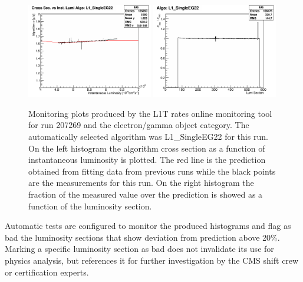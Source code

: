 \begin{figure}[!htb]
\centering
\includegraphics[width=0.49\textwidth]{Chapter03/L1TOnline/Images/L1TDQM_Online_Run207269_L1TRate_TriggerCrossSections_EG.png}
\includegraphics[width=0.49\textwidth]{Chapter03/L1TOnline/Images/L1TDQM_Online_Run207269_L1TRate_Certification_EG.png}
\caption[Monitoring plots produced by the L1T rates online monitoring tool for run 207269 and the electron/gamma object category.]
{Monitoring plots produced by the \gls{L1T} rates online monitoring tool for run 207269 and the electron/gamma object category. The automatically selected algorithm was L1\_SingleEG22 for this run. On the left histogram  the algorithm cross section as a function of instantaneous luminosity is plotted. The red line is the prediction obtained from fitting data from previous runs while the black points are the measurements for this run. On the right histogram the fraction of the measured value over the prediction is showed as a function of the luminosity section.}
\label{FIGURE:TechnicalWork_RateMonitoring}
\end{figure}

Automatic tests are configured to monitor the produced histograms and flag as bad the luminosity sections that show deviation from prediction above 20\%. Marking a specific luminosity section as bad does not invalidate its use for physics analysis, but references it for further investigation by the \gls{CMS} shift crew or certification experts.

